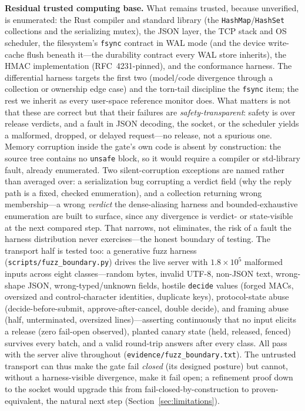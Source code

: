 \documentclass[10pt,journal,compsoc]{IEEEtran}
\begin{document}
\smallskip\noindent\textbf{Residual trusted computing base.} What remains
trusted, because unverified, is enumerated: the Rust compiler and standard
library (the \texttt{HashMap}/\texttt{HashSet} collections and the serializing
mutex), the JSON layer, the TCP stack and OS scheduler, the filesystem's
\texttt{fsync} contract in WAL mode (and the device write-cache flush beneath
it---the durability contract every WAL store inherits), the HMAC
implementation (RFC~4231-pinned), and the conformance harness. The
differential harness targets the first two (model/code divergence through a
collection or ownership edge case) and the torn-tail discipline the
\texttt{fsync} item; the rest we inherit as every user-space reference monitor
does. What matters is not that these are correct but that their failures are
\emph{safety-transparent}: safety is over \textsf{release} verdicts, and a
fault in JSON decoding, the socket, or the scheduler yields a malformed,
dropped, or delayed request---no \textsf{release}, not a spurious one. Memory
corruption inside the gate's own code is absent by construction: the source
tree contains no \texttt{unsafe} block, so it would require a compiler or
std-library fault, already enumerated. Two silent-corruption exceptions are named rather than averaged over: a serialization bug corrupting a verdict field (why the reply path is a fixed, checked enumeration), and a collection returning wrong membership---a wrong \emph{verdict} the dense-aliasing harness and bounded-exhaustive enumeration are built to surface, since any divergence is verdict- or state-visible at the next compared step. That narrows, not eliminates, the risk of a fault the harness
distribution never exercises---the honest boundary of testing. The transport
half is tested too: a generative fuzz harness
(\texttt{scripts/fuzz\_boundary.py}) drives the live server with
$1.8{\times}10^{5}$ malformed inputs across eight classes---random bytes,
invalid UTF-8, non-JSON text, wrong-shape JSON, wrong-typed/unknown fields,
hostile \texttt{decide} values (forged MACs, oversized and control-character
identities, duplicate keys), protocol-state abuse (decide-before-submit,
approve-after-cancel, double decide), and framing abuse (half, unterminated,
oversized lines)---asserting continuously that no input elicits a
\textsf{release} (zero fail-open observed), planted canary state (held,
released, fenced) survives every batch, and a valid round-trip answers after
every class. All pass with the server alive throughout
(\texttt{evidence/fuzz\_boundary.txt}). The untrusted transport can thus make
the gate fail \emph{closed} (its designed posture) but cannot, without a
harness-visible divergence, make it fail open; a refinement proof down to the
socket would upgrade this from fail-closed-by-construction to
proven-equivalent, the natural next step (Section~\ref{sec:limitations}).
\end{document}
